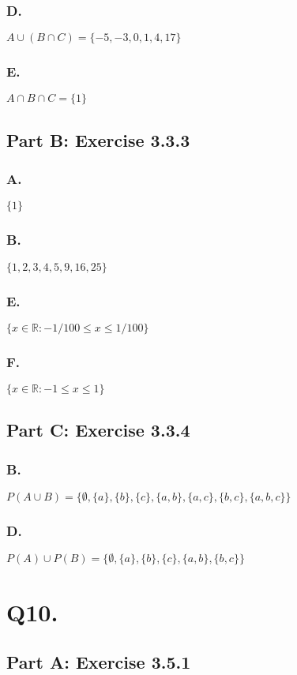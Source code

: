 \documentclass[titlepage]{article}\pagestyle{empty}
\begin{document}
\subsubsection*{D.} $A \cup (B \cap C) = \{-5, -3, 0, 1, 4, 17\}$
\subsubsection*{E.} $A \cap B \cap C  = \{1\}$

\subsection*{Part B: Exercise 3.3.3}
\subsubsection*{A.} $\{1\}$
\subsubsection*{B.} $\{1,2,3,4,5,9,16,25\}$
\subsubsection*{E.} $\{x \in \mathbb{R} : -1/100 \leq x \leq 1/100 \}$
\subsubsection*{F.} $\{x \in \mathbb{R} : -1 \leq x \leq 1 \}$

\subsection*{Part C: Exercise 3.3.4}
\subsubsection*{B.} $P(A \cup B) = \{\emptyset, \{a\}, \{b\}, \{c\}, \{a,b\}, \{a,c\}, \{b,c\}, \{a,b,c\}\}$
\subsubsection*{D.} $P(A)\cup P(B) =  \{\emptyset, \{a\}, \{b\}, \{c\}, \{a,b\}, \{b,c\}\}$

\pagebreak
\section*{Q10.}
\subsection*{Part A: Exercise 3.5.1} 
\end{document}
